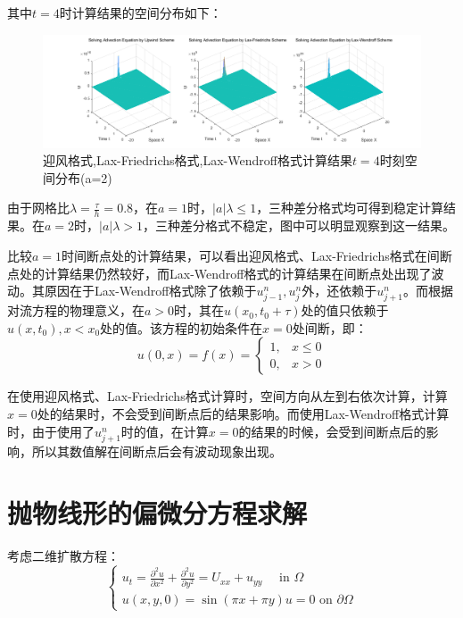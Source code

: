 \documentclass[fontset=mac]{ctexart}
\begin{document}
	其中$t=4$时计算结果的空间分布如下：
	\begin{figure}[H]
		\centering
		\includegraphics[width=\linewidth]{fig/fig7}
		\caption{迎风格式,Lax-Friedrichs格式,Lax-Wendroff格式计算结果$t=4$时刻空间分布(a=2)}
	\end{figure}

	由于网格比$\lambda = \frac{\tau}{h} = 0.8$，在$a=1$时，$|a|\lambda \le 1$，三种差分格式均可得到稳定计算结果。在$a=2$时，$|a|\lambda > 1$，三种差分格式不稳定，图中可以明显观察到这一结果。
	
	比较$a=1$时间断点处的计算结果，可以看出迎风格式、Lax-Friedrichs格式在间断点处的计算结果仍然较好，而Lax-Wendroff格式的计算结果在间断点处出现了波动。其原因在于Lax-Wendroff格式除了依赖于$u_{j-1}^n,u_j^n$外，还依赖于$u_{j+1}^n$。而根据对流方程的物理意义，在$a>0$时，其在$u(x_0,t_0 + \tau)$处的值只依赖于$u(x,t_0),x<x_0$处的值。该方程的初始条件在$x=0$处间断，即：
	$$
	u(0, x)=f(x)=\left\{\begin{array}{ll}
		1, & x \leq 0 \\
		0, & x>0
	\end{array}\right.
	$$
	
	在使用迎风格式、Lax-Friedrichs格式计算时，空间方向从左到右依次计算，计算$x=0$处的结果时，不会受到间断点后的结果影响。而使用Lax-Wendroff格式计算时，由于使用了$u_{j+1}^n$时的值，在计算$x=0$的结果的时候，会受到间断点后的影响，所以其数值解在间断点后会有波动现象出现。
	
	
	
	
	\newpage
	\section{抛物线形的偏微分方程求解}
	考虑二维扩散方程：
	$$
	\left\{\begin{array}{l}
		u_t = \frac{\partial ^2 u}{\partial x^2} + \frac{\partial ^ 2 u}{\partial y ^ 2} = U_{xx}  + u_{yy} \quad \text { in } \Omega \\
		u(x,y,0) = \sin(\pi x + \pi y)
		u=0 \text { on } \partial \Omega
	\end{array}\right.
	$$
	
\end{document}
